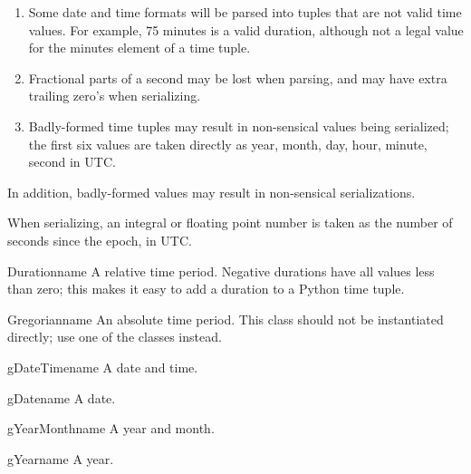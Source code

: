 \begin{enumerate}

\item
Some date and time formats will be parsed into tuples that are
not valid time values.
For example, 75 minutes is a valid duration, although not a legal value
for the minutes element of a time tuple.

\item
Fractional parts of a second may be lost when parsing, and may have
extra trailing zero's when serializing.

\item
Badly-formed time tuples may result in non-sensical values being serialized;
the first six values are taken directly as year, month, day, hour, minute,
second in UTC.

\end{enumerate}

In addition, badly-formed values may result in non-sensical serializations.

When serializing, an integral or floating point number is taken as
the number of seconds since the epoch, in UTC.

\begin{classdesc}{Duration}{name}
A relative time period.
Negative durations have all values less than zero; this makes
it easy to add a duration to a Python time tuple.
\end{classdesc}

\begin{classdesc}{Gregorian}{name}
An absolute time period.
This class should not be instantiated directly; use one of the 
classes instead.
\end{classdesc}

\begin{classdesc}{gDateTime}{name}
A date and time.
\end{classdesc}

\begin{classdesc}{gDate}{name}
A date.
\end{classdesc}

\begin{classdesc}{gYearMonth}{name}
A year and month.
\end{classdesc}

\begin{classdesc}{gYear}{name}
A year.
\end{classdesc}

